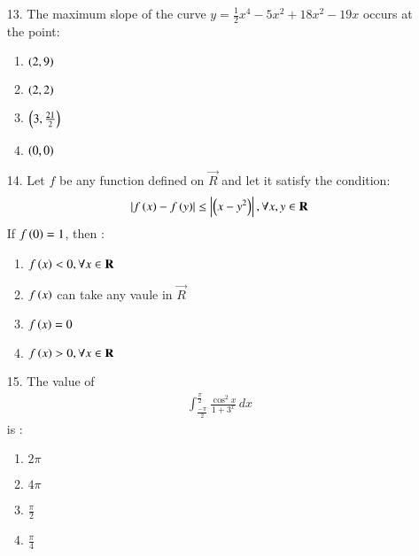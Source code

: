 \documentclass[journal,12pt,onecolumn]{IEEEtran}
\theoremstyle{remark}
\begin{document}
\begin{enumerate}
\begin{figure}
		\end{figure}
	\item[13.] The maximum slope of the curve $y = \frac{1}{2}x^4 -5x^2 + 18x^2 -19x$ occurs at the point:
		\hfill{}
	\begin{multicols}{4}
		\begin{enumerate}
			\item $\left(2, 9\right)$ \columnbreak
			\item $\left(2, 2\right)$ \columnbreak
			\item $\left(3, \frac{21}{2}\right)$ \columnbreak
			\item $\left(0, 0\right)$
		\end{enumerate}
	\end{multicols}
\item[14.] Let $f$ be any function defined on $\vec{R}$ and let it satisfy the condition: 
	\begin{align}
		\left\vert f\left(x\right) - f\left(y\right)\right\vert \le \left\vert\left(x - y^2\right)\right\vert, \forall x, y \in \mathbf{R}
	\end{align} 
		If $f\left(0\right) = 1$, then :
		\hfill{}
		\begin{enumerate}
			\item $f\left(x\right) < 0, \forall x \in \mathbf{R}$
			\item $f\left(x\right)$ can take any vaule in $\vec{R}$
			\item $f\left(x\right) = 0$
			\item $f\left(x\right) > 0, \forall x \in \mathbf{R}$
		\end{enumerate}
\item[15.] The value of
		\begin{align*}
			\int_{\frac{-\pi}{2}} ^ {\frac{\pi}{2}} \frac{\cos ^2 x}{1 + 3^x} \, dx
		\end{align*} is :
		\hfill{}
	\begin{multicols}{4}
		\begin{enumerate}
			\item $2\pi$ \columnbreak
			\item $4\pi$ \columnbreak
			\item $\frac{\pi}{2}$ \columnbreak
			\item $\frac{\pi}{4}$
		\end{enumerate}
	\end{multicols}
	\end{enumerate}
\end{document}
